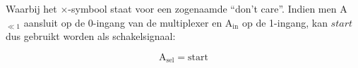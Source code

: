 \vspace{\textfloatsep}
\begin{minipage}{\linewidth}
	\begin{center}
	\end{center}
	\end{minipage}
\vspace{\textfloatsep}

Waarbij het $\times$-symbool staat voor een zogenaamde ``don't care''. Indien men A$_{\ll 1}$ aansluit op de 0-ingang van de multiplexer en A$_{\text{in}}$ op de 1-ingang, kan $start$ dus gebruikt worden als schakelsignaal:

\[ \text{A}_{\text{sel}} = \text{start} \]
